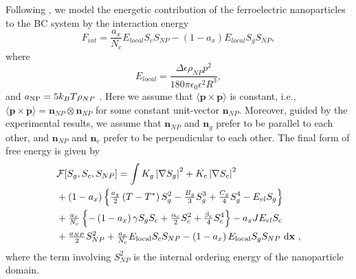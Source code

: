 \documentclass[reprint,amsfonts,amsmath,amssymb,aps,pre,floatfix,10pt]{revtex4-1}
\newcommand\dd{\mathrm{d}}
\newcommand\x{\mathbf{x}}
\newcommand\n{\mathbf{n}}
\newcommand\Q{\mathbf{Q}}
\begin{document}
Following \cite{lopatina2009theory_13}, we model the energetic contribution of the ferroelectric nanoparticles to the BC system by the interaction energy
\begin{equation}
  F_{int} =  \frac{a_x}{N_c} E_{l o c a l} S_c S_{N P}-\left(1-a_x\right) E_{l o c a l} S_g S_{N P},
\end{equation}
where 
\begin{equation}
  E_{local} =  \frac{\Delta \epsilon \rho_{NP} p^2}{180 \pi \epsilon_0 \epsilon^2 R^3},
\end{equation}
and $a_{\rm NP} = 5 k_B T \rho_{NP}$ \cite{lopatina2009theory_13}. Here we assume that $\langle {\bm p} \times {\bm p} \rangle$ is constant, i.e., $\langle {\bm p} \times {\bm p} \rangle = \n_{NP}\otimes \n_{NP}$ for some constant unit-vector $\n_{NP}$. Moreover, guided by the experimental results, we assume that $\n_{NP}$ and $\n_g$ prefer to be parallel to each other, and $\n_{NP}$ and $\n_c$ prefer to be perpendicular to each other.
The final form of free energy is given by
\begin{equation}\label{FE1}
\begin{aligned} 
& \mathcal{F}[S_g, S_c, S_{NP}]= \int K_g\left|\nabla S_g\right|^2 +K_c\left|\nabla S_c\right|^2 \\
 & +\left(1-a_x\right)\Bigl\{\tfrac{a_g}{2}\left(T-T^*\right) S_g^2-\tfrac{B_g}{3} S_g^3+\tfrac{C_g}{4} S_g^4-E_{e l} S_g\Bigr\} \\ &+ \tfrac{a_x}{N_c}\left\{-\left(1-a_x\right) \gamma S_g S_c+\tfrac{\alpha_c}{2} S_c^2+\tfrac{\beta_c}{4} S_c^4\right\}-a_x J E_{e l} S_c \\
& +\tfrac{a_{N P}}{2} S_{N P}^2 + \tfrac{a_x}{N_c} E_{\rm  local} S_c S_{NP}-\left(1-a_x\right) E_{\rm local} S_g S_{NP} ~ \dd \x  \ , \end{aligned}
\end{equation}
where the term involving $S_{NP}^2$ is the internal ordering energy of the nanoparticle domain.
\end{document}
